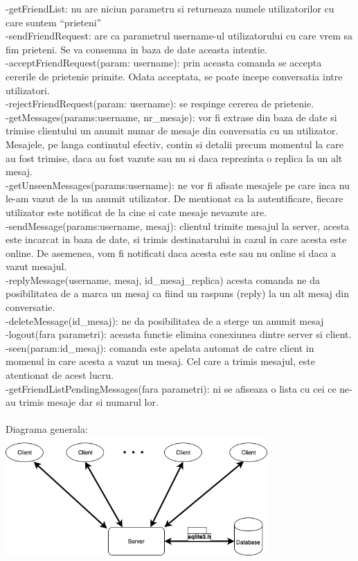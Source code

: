 \documentclass[runningheads]{llncs}
\begin{document}
-getFriendList: nu are niciun parametru si returneaza numele utilizatorilor cu care suntem “prieteni”\\
-sendFriendRequest: are ca parametrul username-ul utilizatorului cu care vrem sa fim prieteni. Se va consemna in baza de date aceasta intentie.\\
-acceptFriendRequest(param: username): prin aceasta comanda se accepta cererile de prietenie primite. Odata acceptata, se poate incepe conversatia intre utilizatori.\\
-rejectFriendRequest(param: username): se respinge cererea de prietenie.\\
-getMessages(params:username, nr\_mesaje): vor fi extrase din baza de date si trimise clientului un anumit numar de mesaje din conversatia cu un utilizator. Mesajele, pe langa continutul efectiv, contin si detalii precum momentul la care au fost trimise, daca au fost vazute sau nu si daca reprezinta o replica la un alt mesaj.\\
-getUnseenMessages(params:username): ne vor fi afisate mesajele pe care inca nu le-am vazut de la un anumit utilizator. De mentionat ca la autentificare, fiecare utilizator este notificat de la cine si cate mesaje nevazute are.\\
-sendMessage(params:username, mesaj): clientul trimite mesajul la server, acesta este incarcat in baza de date, si trimis destinatarului in cazul in care acesta este online. De asemenea, vom fi notificati daca acesta este sau nu online si daca a vazut mesajul.\\
-replyMessage(username, mesaj, id\_mesaj\_replica) acesta comanda ne da posibilitatea de a marca un mesaj ca fiind un raspuns (reply) la un alt mesaj din conversatie.\\
-deleteMessage(id\_mesaj): ne da posibilitatea de a sterge un anumit mesaj\\
-logout(fara parametri): aceasta functie elimina conexiunea dintre server si client.\\
-seen(param:id\_mesaj): comanda este apelata automat de catre client in momenul in care acesta a vazut un mesaj. Cel care a trimis mesajul, este atentionat de acest lucru.\\
-getFriendListPendingMessages(fara parametri): ni se afiseaza o lista cu cei ce ne-au trimis mesaje dar si numarul lor.\\
\bigskip\\
Diagrama generala:\\
\includegraphics[width=100mm,scale=1]{retele_pics/general_diagram.png}\\
\end{document}
